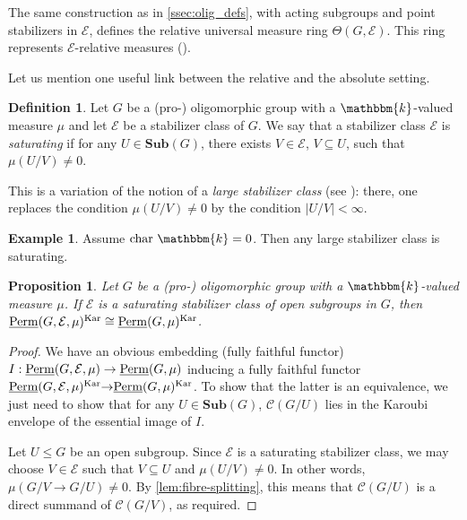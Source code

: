 \documentclass[11pt,a4paper]{amsart}
\theoremstyle{plain}%
\newtheorem{proposition}[lemma]{Proposition}
\theoremstyle{definition}
\newtheorem{definition}[lemma]{Definition}
\newtheorem{example}[lemma]{Example}
\theoremstyle{remark}
\newcommand{\Perm}{\underline{{\rm Perm}}}
\newcommand{\kk}{\mathbbm{k}}
\newcommand{\Kar}{\mathrm{Kar}}
\newcommand{\Sub}{\mathbf{Sub}}
\begin{document}
The same construction as in \cref{ssec:olig_defs}, with acting subgroups and point stabilizers in $\mathcal E$, defines the relative universal measure ring
$\Theta(G,\mathcal E)$. This ring represents $\mathcal E$-relative measures (\cite[Remark~3.8]{HS-oligomorphic}).



Let us mention one useful link between the relative and the absolute setting.

\begin{definition}\label{def:saturating}
Let $G$ be a (pro-) oligomorphic group with a $\kk$-valued measure $\mu$ and let $\mathcal{E}$ be a stabilizer class of $G$. We say that a stabilizer class $\mathcal{E}$ is \emph{saturating} if for any $U\in \Sub(G)$, there exists $V\in \mathcal{E}${, $V\subseteq U$,} such that $\mu(U/V)\neq 0$.
\end{definition}
This is a variation of the notion of a \emph{large stabilizer class} (see {\cite[Section 3.4(d)]{HS-oligomorphic}}): there, one replaces the condition $\mu(U/V)\neq 0$ by the condition $|U/V|<\infty$.
\begin{example}
    Assume $\mathrm{char}~\kk = 0$. Then any large stabilizer class is saturating. 
\end{example}

\begin{proposition}\label{prop:saturating_stab_class}
    Let $G$ be a (pro-) oligomorphic group with a $\kk$-valued measure $\mu$. If $\mathcal{E}$ is a saturating stabilizer class of open subgroups in $G$, then $\Perm(G, \mathcal{E}, \mu)^{\Kar}\cong \Perm(G, \mu)^{\Kar}$.
\end{proposition}

\begin{proof}
We have an obvious embedding (fully faithful functor) $I:\Perm(G, \mathcal{E}, \mu) \to \Perm(G, \mu)$ inducing a fully faithful functor $\Perm(G, \mathcal{E}, \mu)^{\Kar}{\to} \Perm(G, \mu)^{\Kar}$. To show that the latter is an equivalence, we just need to show that for any $U\in \Sub(G)$, $\mathcal{C}(G/U)$ lies in the Karoubi envelope of the essential image of $I$.

    Let $U\leq G $ be an open subgroup. Since $\mathcal{E}$ is a saturating stabilizer class, we may choose $V\in \mathcal{E}$ such that $V\subseteq U$ and $\mu(U/V)\neq 0$. In other words, $\mu(G/V\to G/U)\neq 0$. By \cref{lem:fibre-splitting}, this means that $\mathcal{C}(G/U)$ is a direct {summand} of $\mathcal{C}(G/V)$, as required. 
\end{proof}
\end{document}
